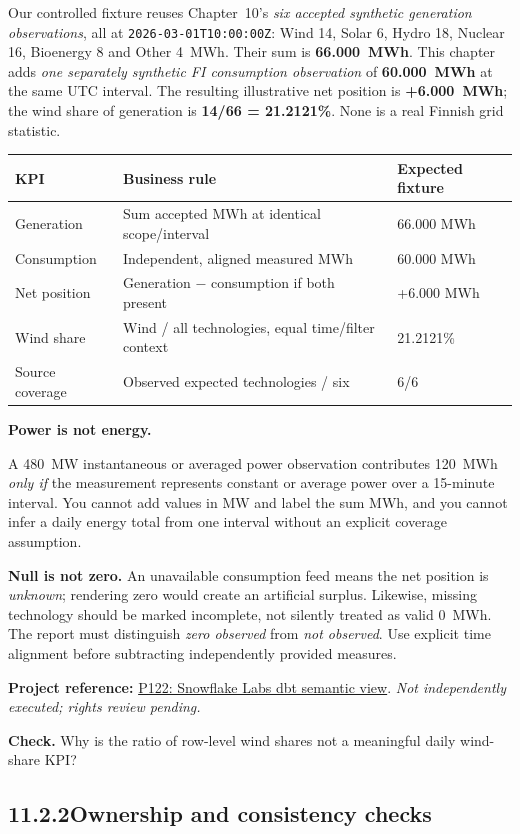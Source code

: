 \documentclass[11pt,twoside]{article}
\newcommand{\topic}[2]{\subsection*{#1\quad #2}}
\newcommand{\repo}[2]{\par\begingroup\fontsize{8.0}{9.6}\selectfont\sffamily\color{inkgray}\textbf{Project reference:} \href{#2}{#1}. \textit{Not independently executed; rights review pending.}\par\endgroup}
\begin{document}
Our controlled fixture reuses Chapter~10's \emph{six accepted synthetic generation observations}, all at \texttt{2026-03-01T10:00:00Z}: Wind 14, Solar 6, Hydro 18, Nuclear 16, Bioenergy 8 and Other 4~MWh. Their sum is \textbf{66.000~MWh}. This chapter adds \emph{one separately synthetic FI consumption observation} of \textbf{60.000~MWh} at the same UTC interval. The resulting illustrative net position is \textbf{+6.000~MWh}; the wind share of generation is \textbf{14/66 = 21.2121\%}. None is a real Finnish grid statistic.
\begin{center}\renewcommand{\arraystretch}{1.10}\begin{tabularx}{\linewidth}{@{}p{29mm}XX@{}}\toprule
\textbf{KPI}&\textbf{Business rule}&\textbf{Expected fixture}\\\midrule
Generation&Sum accepted MWh at identical scope/interval&66.000 MWh\\
Consumption&Independent, aligned measured MWh&60.000 MWh\\
Net position&Generation $-$ consumption if both present&+6.000 MWh\\
Wind share&Wind / all technologies, equal time/filter context&21.2121\%\\
Source coverage&Observed expected technologies / six&6/6\\\bottomrule\end{tabularx}\end{center}
\begin{insight}\textbf{Power is not energy.}\par
A 480~MW instantaneous or averaged power observation contributes 120~MWh \emph{only if} the measurement represents constant or average power over a 15-minute interval. You cannot add values in MW and label the sum MWh, and you cannot infer a daily energy total from one interval without an explicit coverage assumption.\end{insight}
\textbf{Null is not zero.} An unavailable consumption feed means the net position is \emph{unknown}; rendering zero would create an artificial surplus. Likewise, missing technology should be marked incomplete, not silently treated as valid 0~MWh. The report must distinguish \emph{zero observed} from \emph{not observed}. Use explicit time alignment before subtracting independently provided measures.
\repo{P122: Snowflake Labs dbt semantic view}{https://github.com/Snowflake-Labs/dbt_semantic_view}
\textbf{Check.} Why is the ratio of row-level wind shares not a meaningful daily wind-share KPI?
\newpage
\topic{11.2.2}{Ownership and consistency checks}
\end{document}

